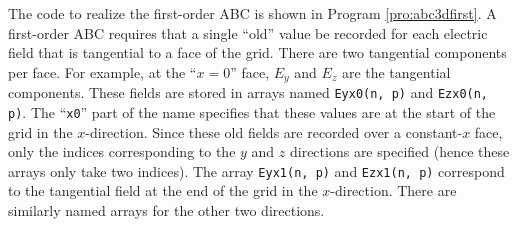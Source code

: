 The code to realize the first-order ABC is shown in Program
\ref{pro:abc3dfirst}.  A first-order ABC requires that a single
``old'' value be recorded for each electric field that is tangential
to a face of the grid.  There are two tangential components per face.
For example, at the ``$x=0$'' face, $E_y$ and $E_z$ are the tangential
components.  These fields are stored in arrays named {\tt Eyx0(n, p)}
and {\tt Ezx0(n, p)}.  The ``{\tt x0}'' part of the name specifies
that these values are at the start of the grid in the $x$-direction.
Since these old fields are recorded over a constant-$x$ face, only the
indices corresponding to the $y$ and $z$ directions are specified
(hence these arrays only take two indices).  The array {\tt Eyx1(n,
  p)} and {\tt Ezx1(n, p)} correspond to the tangential field at the
end of the grid in the $x$-direction.  There are similarly named
arrays for the other two directions.

